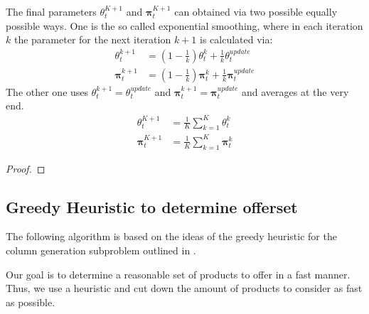 The final parameters $\theta_t^{K+1}$ and $\mathbf{\pi}_t^{K+1}$ can obtained via two possible equally possible ways. One is the so called exponential smoothing, where in each iteration $k$ the parameter for the next iteration $k+1$ is calculated via:
\begin{align}
\theta_t^{k+1} &= \left(1- \frac{1}{k} \right)	\theta_t^k + \frac{1}{k} \theta_t^{update}\\
\mathbf{\pi}_t^{k+1} &= \left(1- \frac{1}{k} \right)	\mathbf{\pi}_t^k + \frac{1}{k} \mathbf{\pi}_t^{update}
\end{align}
The other one uses $\theta_t^{k+1} = \theta_t^{update}$ and $\mathbf{\pi}_t^{k+1} = \mathbf{\pi}_t^{update}$ and averages at the very end.
\begin{align}
\theta_t^{K+1} &= \frac{1}{K}\sum_{k=1}^{K}\theta_t^k\\
\mathbf{\pi}_t^{K+1} &= \frac{1}{K}\sum_{k=1}^{K}\mathbf{\pi}_t^k
\end{align}

\begin{proof}
\end{proof}


\subsection{Greedy Heuristic to determine offerset}

The following algorithm is based on the ideas of the greedy heuristic for the column generation subproblem outlined in \cite{Bront.2009}.

Our goal is to determine a reasonable set of products to offer in a fast manner. Thus, we use a heuristic and cut down the amount of products to consider as fast as possible.


